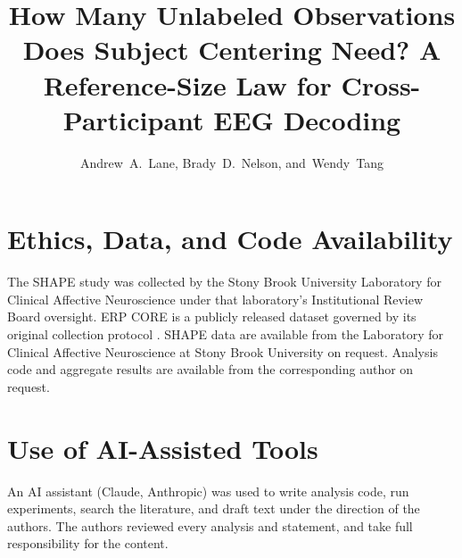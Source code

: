 \documentclass[journal]{IEEEtran}
\begin{document}
\title{How Many Unlabeled Observations Does Subject Centering Need? A Reference-Size Law for Cross-Participant EEG Decoding}
\author{Andrew~A.~Lane, Brady~D.~Nelson, and~Wendy~Tang}
\maketitle








\section*{Ethics, Data, and Code Availability}
The SHAPE study was collected by the Stony Brook University Laboratory for Clinical Affective Neuroscience under that laboratory's Institutional Review Board oversight. ERP CORE is a publicly released dataset governed by its original collection protocol \cite{kappenman2021erpcore}.
SHAPE data are available from the Laboratory for Clinical Affective Neuroscience at Stony Brook University on request. Analysis code and aggregate results are available from the corresponding author on request.

\section*{Use of AI-Assisted Tools}
An AI assistant (Claude, Anthropic) was used to write analysis code, run experiments, search the literature, and draft text under the direction of the authors. The authors reviewed every analysis and statement, and take full responsibility for the content.



\end{document}
